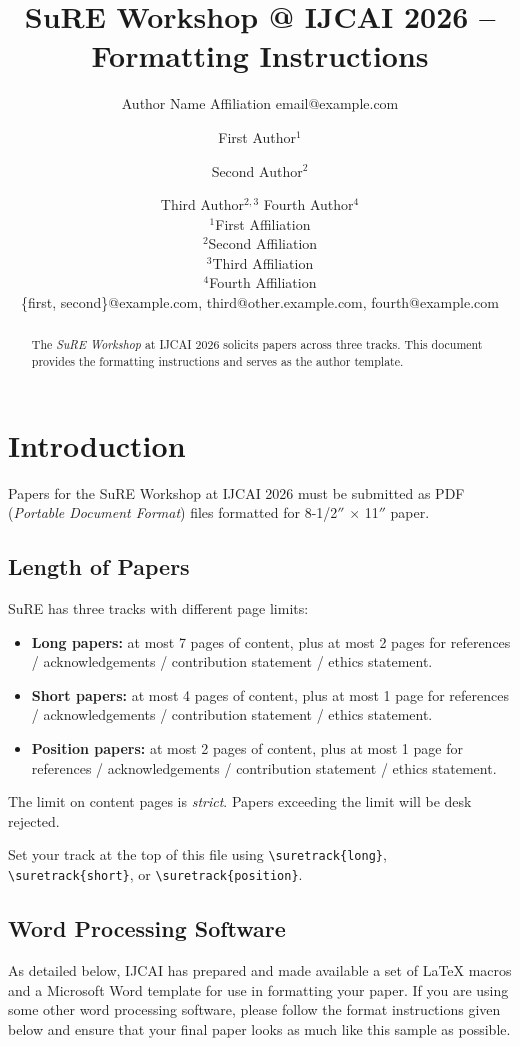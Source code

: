 \documentclass{article}
\title{SuRE Workshop @ IJCAI 2026 -- Formatting Instructions}
\author{
    Author Name
    \affiliations
    Affiliation
    \emails
    email@example.com
}
\author{
First Author$^1$
\and
Second Author$^2$\and
Third Author$^{2,3}$\And
Fourth Author$^4$\\
\affiliations
$^1$First Affiliation\\
$^2$Second Affiliation\\
$^3$Third Affiliation\\
$^4$Fourth Affiliation\\
\emails
\{first, second\}@example.com,
third@other.example.com,
fourth@example.com
}
\begin{document}
\maketitle

\begin{abstract}
	The {\it SuRE Workshop} at IJCAI 2026 solicits papers across three
	tracks. This document provides the formatting instructions and serves
	as the author template.
\end{abstract}

\section{Introduction}

Papers for the SuRE Workshop at IJCAI 2026 must be submitted as PDF
({\em Portable Document Format}) files formatted for 8-1/2$''$ $\times$ 11$''$ paper.

\subsection{Length of Papers}

SuRE has three tracks with different page limits:
\begin{itemize}
	\item {\bf Long papers:} at most 7 pages of content, plus at most 2 pages for references / acknowledgements / contribution statement / ethics statement.
	\item {\bf Short papers:} at most 4 pages of content, plus at most 1 page for references / acknowledgements / contribution statement / ethics statement.
	\item {\bf Position papers:} at most 2 pages of content, plus at most 1 page for references / acknowledgements / contribution statement / ethics statement.
\end{itemize}
The limit on content pages is {\em strict}. Papers exceeding the limit will be desk rejected.

Set your track at the top of this file using {\tt \textbackslash{}suretrack\{long\}},
{\tt \textbackslash{}suretrack\{short\}}, or {\tt \textbackslash{}suretrack\{position\}}.


\subsection{Word Processing Software}

As detailed below, IJCAI has prepared and made available a set of
\LaTeX{} macros and a Microsoft Word template for use in formatting
your paper. If you are using some other word processing software, please follow the format instructions given below and ensure that your final paper looks as much like this sample as possible.
\end{document}
